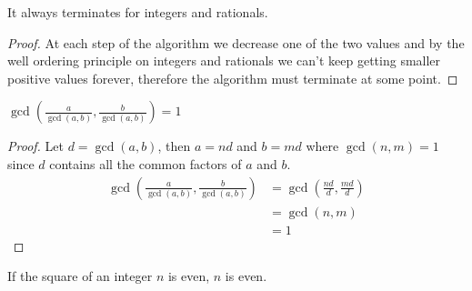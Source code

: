 \begin{lemma}
	It always terminates for integers and rationals.
\end{lemma}

\begin{proof}
	At each step of the algorithm we decrease one of the two values and by the well ordering principle
	on integers and rationals we can't keep getting smaller positive values forever, therefore the
	algorithm must terminate at some point.
\end{proof}

\begin{lemma}
	$\gcd(\frac{a}{\gcd(a, b)}, \frac{b}{\gcd(a, b)}) = 1$
\end{lemma}

\begin{proof}
	Let $d = \gcd(a, b)$, then $a = nd$ and $b = md$ where $\gcd(n, m) = 1$ since $d$ contains
	all the common factors of $a$ and $b$.
	\begin{align*}
		\gcd(\frac{a}{\gcd(a, b)}, \frac{b}{\gcd(a, b)})
		&= \gcd(\frac{nd}{d}, \frac{md}{d})\\
		&= \gcd(n, m)\\
		&= 1
	\end{align*}
\end{proof}

\begin{lemma}
	If the square of an integer $n$ is even, $n$ is even.
\end{lemma}
